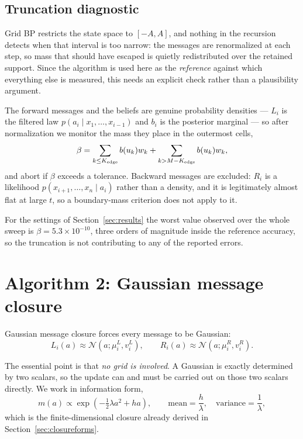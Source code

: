 \documentclass[11pt]{article}
\newcommand{\Normal}{\mathcal{N}}
\begin{document}
\subsection{Truncation diagnostic}
\label{sec:diagnostics}

Grid BP restricts the state space to \([-A,A]\), and nothing in the recursion detects when
that interval is too narrow: the messages are renormalized at each step, so mass that
should have escaped is quietly redistributed over the retained support. Since the
algorithm is used here as the \emph{reference} against which everything else is measured,
this needs an explicit check rather than a plausibility argument.

The forward messages and the beliefs are genuine probability densities --- \(L_i\) is the
filtered law \(p(a_i\mid x_1,\dots,x_{i-1})\) and \(b_i\) is the posterior marginal --- so
after normalization we monitor the mass they place in the outermost cells,
\begin{equation}
  \beta
  =
  \sum_{k\le K_{\rm edge}} b(u_k)w_k
  +
  \sum_{k>M-K_{\rm edge}} b(u_k)w_k ,
\end{equation}
and abort if \(\beta\) exceeds a tolerance. Backward messages are excluded: \(R_i\) is a
likelihood \(p(x_{i+1},\dots,x_n\mid a_i)\) rather than a density, and it is legitimately
almost flat at large \(t\), so a boundary-mass criterion does not apply to it.

For the settings of Section~\ref{sec:results} the worst value observed over the whole
sweep is \(\beta=5.3\times10^{-10}\), three orders of magnitude inside the reference
accuracy, so the truncation is not contributing to any of the reported errors.

\section{Algorithm 2: Gaussian message closure}
\label{sec:closure}

Gaussian message closure forces every message to be Gaussian:
\begin{equation}
  L_i(a)\approx \Normal(a;\mu_i^L,v_i^L),
  \qquad
  R_i(a)\approx \Normal(a;\mu_i^R,v_i^R).
\end{equation}

The essential point is that \emph{no grid is involved}. A Gaussian is exactly determined
by two scalars, so the update can and must be carried out on those two scalars directly.
We work in information form,
\begin{equation}
  m(a)\propto\exp\!\left(-\tfrac12\lambda a^2+ha\right),
  \qquad
  \text{mean}=\frac{h}{\lambda},\quad \text{variance}=\frac1\lambda,
\end{equation}
which is the finite-dimensional closure already derived in Section~\ref{sec:closureforms}.
\end{document}

